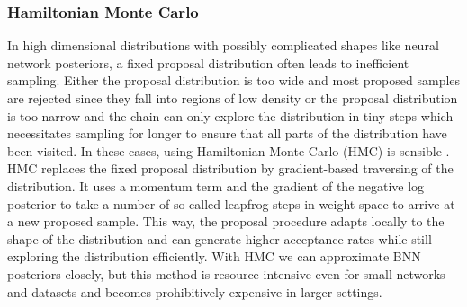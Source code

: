 \documentclass[../thesis.tex]{subfiles}
\begin{document}
\subsubsection{Hamiltonian Monte Carlo}
In high dimensional distributions with possibly complicated shapes like neural network posteriors, a fixed proposal distribution often leads to inefficient sampling. Either the proposal distribution is too wide and most proposed samples are rejected since they fall into regions of low density or the proposal distribution is too narrow and the chain can only explore the distribution in tiny steps which necessitates sampling for longer to ensure that all parts of the distribution have been visited. In these cases, using Hamiltonian Monte Carlo (HMC) is sensible \parencite{duane1987hybrid, neal1995bayesian}. HMC replaces the fixed proposal distribution by gradient-based traversing of the distribution. It uses a momentum term and the gradient of the negative log posterior to take a number of so called leapfrog steps in weight space to arrive at a new proposed sample. This way, the proposal procedure adapts locally to the shape of the distribution and can generate higher acceptance rates while still exploring the distribution efficiently. With HMC we can approximate BNN posteriors closely, but this method is resource intensive even for small networks and datasets and becomes prohibitively expensive in larger settings.
\end{document}
